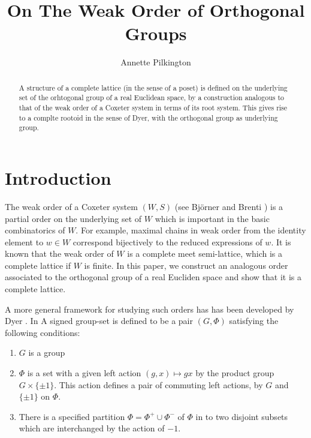 \documentclass[psamsfonts]{amsart}
\numberwithin{equation}{subsection}
\theoremstyle{plain}
\theoremstyle{definition}
\theoremstyle{remark}
\begin{document}
\title[On The Weak Order of Orthogonal Groups] {On The Weak Order of Orthogonal Groups }

\author {Annette Pilkington}
 \address{Department of Mathematics\\ University of Notre
Dame\\ Room 255 Hurley Building \\ Notre Dame, Indiana, 46556}



\maketitle    

\begin{abstract}
A structure of a complete lattice (in the sense of a poset)    is defined  on the underlying set of the orhtogonal group  of a real Euclidean space, by a construction  analogous to that of the weak order of   a Coxeter system in terms of its root system.  This gives rise to a complte rootoid
in the sense of Dyer, with the orthogonal group as underlying group.
\end{abstract}


\section{Introduction}

  The weak order of a Coxeter system $(W,S)$ (see Bj{\"o}rner and Brenti \cite{BnB})  is a partial order on the underlying set of $W$  which is important in  the basic combinatorics of $W$. For example, maximal chains in weak order from the identity element to $w\in W$  correspond bijectively to the reduced expressions of $w$. It is known that the weak order of $W$ is a complete meet semi-lattice, which is a complete lattice if $W$ is finite.
 In this paper, we construct  an analogous order associated to the orthogonal group of a real Eucliden space and show that it  is  a complete lattice.

A more  general framework for studying such orders  has  has been developed by  Dyer \cite{Dyer}.
In \cite{Dyer} 
 A signed group-set is defined to be a pair   $(G,\Phi)$ satisfying the following conditions:
 
 \begin{enumerate}\item[(1)]  $G$ is a group
 \item[(2)]  $\Phi$ is a set with  a given left action $(g,x)\mapsto gx$ by the product  group $G\times \{\pm 1\}$. This action defines a pair of commuting left actions, by $G$  and $\{\pm 1\}$ on $\Phi$.
 \item[(3)] There is a specified partition  $\Phi=\Phi^{+}\cup \Phi^{-}$ of $\Phi$ in to two disjoint subsets which are interchanged by the action of $-1$.
 \end{enumerate}
 
\end{document}
